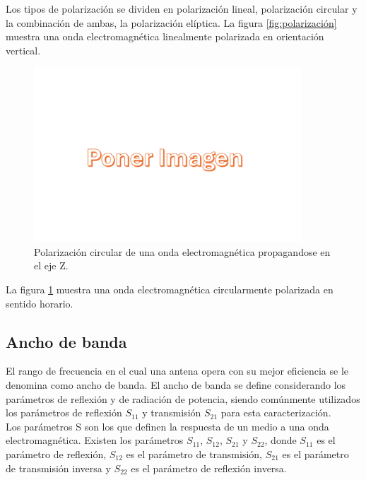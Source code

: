Los tipos de polarización se dividen en polarización lineal, polarización circular y la combinación de ambas, la polarización elíptica. La figura \ref{fig:polarización} muestra una onda electromagnética linealmente polarizada en orientación vertical.\\

\begin{figure}
    \centering
    \includegraphics[width = 10cm]{img/imagen.png}
    \caption{Polarización circular de una onda electromagnética propagandose en el eje Z.}
    \label{fig:polarizacion2}
\end{figure}

La figura \ref{fig:polarizacion2} muestra una onda electromagnética circularmente polarizada en sentido horario.\\



\subsection{Ancho de banda}

El rango de frecuencia en el cual una antena opera con su mejor eficiencia se le denomina como ancho de banda. El ancho de banda se define considerando los parámetros de reflexión y de radiación de potencia, siendo comúnmente utilizados los parámetros de reflexión $S_{11}$ y transmisión $S_{21}$ para esta caracterización.\\

Los parámetros S son los que definen la respuesta de un medio a una onda electromagnética. Existen los parámetros $S_{11}$, $S_{12}$, $S_{21}$ y $S_{22}$, donde $S_{11}$ es el parámetro de reflexión, $S_{12}$ es el parámetro de transmisión, $S_{21}$ es el parámetro de transmisión inversa y $S_{22}$ es el parámetro de reflexión inversa.\\

